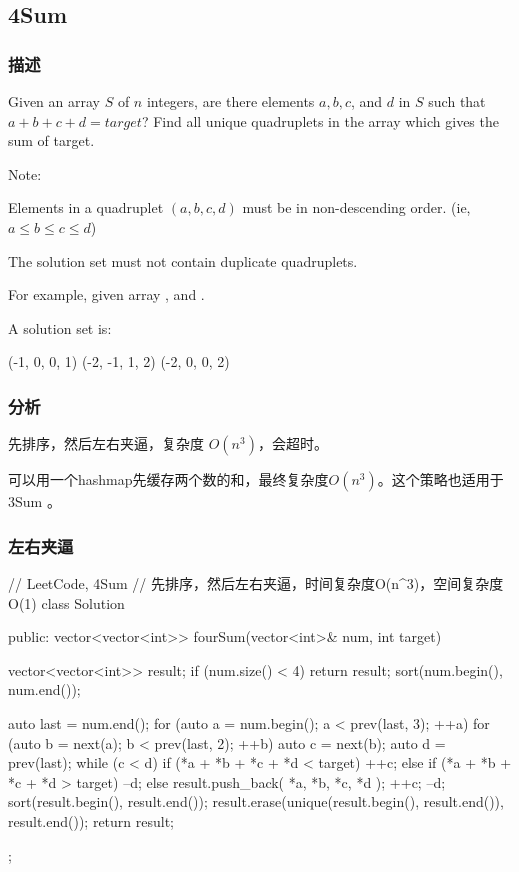 \subsection{4Sum} %
\label{sec:4sum}


\subsubsection{描述}
Given an array $S$ of $n$ integers, are there elements $a, b, c$, and $d$ in 
$S$ such that $a + b + c + d = target$? Find all unique quadruplets in the 
array which gives the sum of target.

Note:
\begindot
\item Elements in a quadruplet $(a,b,c,d)$ must be in non-descending order. 
(ie, $a \leq b \leq c \leq d$)
\item The solution set must not contain duplicate quadruplets.
\myenddot

For example, given array , and . 

A solution set is:
\begin{Code}
	(-1,  0, 0, 1)
	(-2, -1, 1, 2)
	(-2,  0, 0, 2)
\end{Code}


\subsubsection{分析}
先排序，然后左右夹逼，复杂度 $O(n^3)$，会超时。

可以用一个hashmap先缓存两个数的和，最终复杂度$O(n^3)$。这个策略也适用于 3Sum 。


\subsubsection{左右夹逼}
\begin{Code}
	// LeetCode, 4Sum
	// 先排序，然后左右夹逼，时间复杂度O(n^3)，空间复杂度O(1)
	class Solution {
		public:
		vector<vector<int>> fourSum(vector<int>& num, int target) {
			vector<vector<int>> result;
			if (num.size() < 4) return result;
			sort(num.begin(), num.end());
			
			auto last = num.end();
			for (auto a = num.begin(); a < prev(last, 3); ++a) {
				for (auto b = next(a); b < prev(last, 2); ++b) {
					auto c = next(b);
					auto d = prev(last);
					while (c < d) {
						if (*a + *b + *c + *d < target) {
							++c;
						} else if (*a + *b + *c + *d > target) {
						--d;
					} else {
					result.push_back({ *a, *b, *c, *d });
					++c;
					--d;
				}
			}
		}
	}
	sort(result.begin(), result.end());
	result.erase(unique(result.begin(), result.end()), result.end());
	return result;
}
};
\end{Code}


